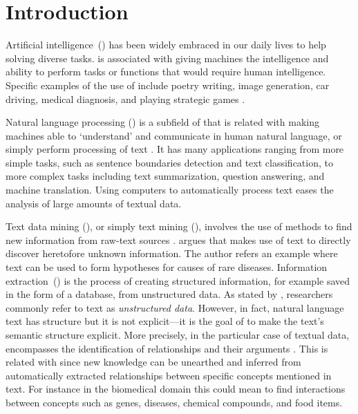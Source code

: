 \chapter{Introduction}
\label{c1}

Artificial intelligence~() has been widely embraced in our daily lives to help solving diverse tasks.  is associated with giving machines the intelligence and ability to perform tasks or functions that would require human intelligence.
Specific examples of the use of  include poetry writing, image generation, car driving, medical diagnosis, and playing strategic games \parencite{russell2009a}.

Natural language processing () is a subfield of  that is related with making machines able to `understand' and communicate in human natural language, or simply perform processing of text \parencite{jurafsky2008a,indurkhya2010a}.
It has many applications ranging from more simple tasks, such as sentence boundaries detection and text classification, to more complex tasks including text summarization, question answering, and machine translation.
Using computers to automatically process text eases the analysis of large amounts of textual data.

Text data mining (), or simply text mining (), involves the use of  methods to find new information from raw-text sources \parencite{hearst1999a,hotho2005a,allahyari2017a}.
\textcite{hearst1999a} argues that  makes use of text to directly discover heretofore unknown information.
The author refers an example where text can be used to form hypotheses for causes of rare diseases.
Information extraction~() is the process of creating structured information, for example saved in the form of a database, from unstructured data.
As stated by \textcite{grishman2015a},  researchers commonly refer to text as \textit{unstructured data}. However, in fact, natural language text has structure but it is not explicit---it is the goal of  to make the text's semantic structure explicit.
More precisely, in the particular case of textual data,  encompasses the identification of relationships and their arguments \parencite{grishman1997a,sarawagi2008a,grishman2019a}.
This is related with  since new knowledge can be unearthed and inferred from automatically extracted relationships between specific concepts mentioned in text. For instance in the biomedical domain this could mean to find interactions between concepts such as genes, diseases, chemical compounds, and food items.

